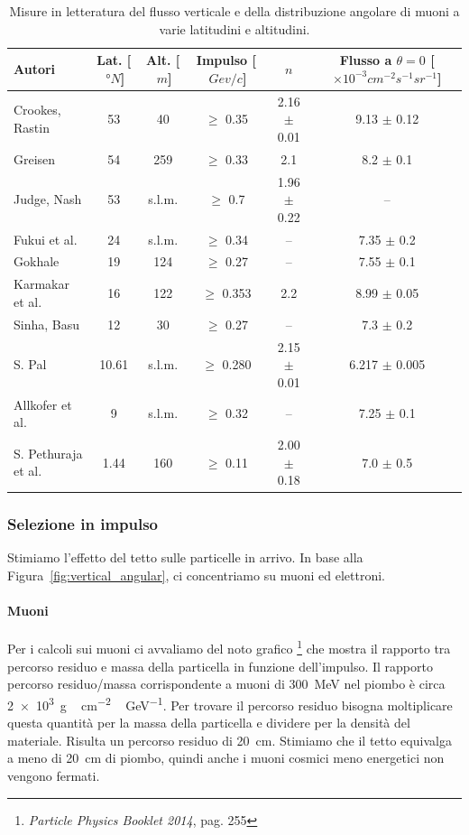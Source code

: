 \begin{table}
	\small
	\hspace{-3em}
	\begin{tabular}{lccccc}
		\hline
		Autori & Lat. [$\SI{}{\degree N}$]& Alt. [$\SI{}{m}$]& Impulso [$\SI{}{Gev/c}$] &$n$ & \makecell{Flusso a $\theta=0$\\{}[$\times 10^{-3}\si{cm^{-2}s^{-1}sr^{-1}}$]}\\
		\hline
		Crookes, Rastin \cite{2} & 53 & 40 &$\ge$ 0.35 &2.16 $\pm$ 0.01 &9.13  $\pm$ 0.12\\
		Greisen \cite{3} \cite{4}& 54 & 259 &$\ge$ 0.33& 2.1 &8.2  $\pm$ 0.1\\
		Judge, Nash \cite{5}& 53 & s.l.m. & $\ge$ 0.7 & 1.96  $\pm$ 0.22 & --\\
		Fukui et al. \cite{6}& 24 & s.l.m.& $\ge$ 0.34 &-- &7.35 $\pm$ 0.2\\
		Gokhale \cite{7}& 19 & 124 &$\ge$ 0.27 &-- &7.55 $\pm$ 0.1\\
		Karmakar et al. \cite{8}& 16 & 122 &$\ge$ 0.353 &2.2 &8.99 $\pm$ 0.05\\
		Sinha, Basu \cite{9}& 12 & 30 &$\ge$ 0.27 &-- &7.3 $\pm$ 0.2\\
		S. Pal \cite{10}& 10.61 & s.l.m. &$\ge$ 0.280 &2.15 $\pm$ 0.01 &6.217 $\pm$ 0.005\\
		Allkofer et al. \cite{11}& 9 & s.l.m. &$\ge$ 0.32 &-- &7.25 $\pm$ 0.1\\
		S. Pethuraja et al. \cite{12}&1.44 & 160 &$\ge$ 0.11 &2.00 $\pm$ 0.18 & 7.0 $\pm$ 0.5\\
		\hline
	\end{tabular}
	\caption{\label{tab:letteratura}
	Misure in letteratura del flusso verticale e della distribuzione angolare di muoni
	a varie latitudini e altitudini.}
\end{table}

\subsubsection{Selezione in impulso}

Stimiamo l'effetto del tetto sulle particelle in arrivo.
In base alla Figura~\ref{fig:vertical_angular},
ci concentriamo su muoni ed elettroni.

\paragraph{Muoni}

Per i calcoli sui muoni ci avvaliamo del noto grafico%
\footnote{\emph{Particle Physics Booklet 2014}, pag. 255}
che mostra il rapporto tra percorso residuo e massa della particella in funzione dell'impulso.
Il rapporto percorso residuo/massa corrispondente a muoni di \SI{300}{MeV}
nel piombo è circa \SI{2e3}{g\,cm^{-2}\,GeV^{-1}}.
Per trovare il percorso residuo bisogna moltiplicare questa quantità per la massa della particella
e dividere per la densità del materiale.
Risulta un percorso residuo di \SI{20}{cm}.
Stimiamo che il tetto equivalga a meno di \SI{20}{cm} di piombo,
quindi anche i muoni cosmici meno energetici non vengono fermati.


